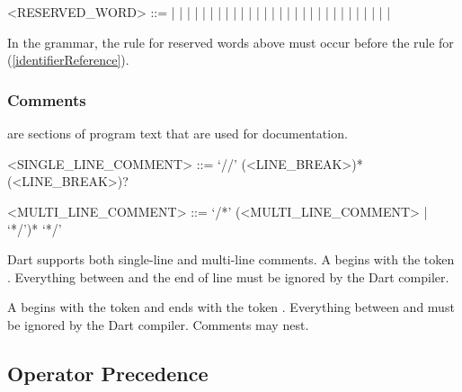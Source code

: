 \documentclass[makeidx]{article}
\begin{document}
{\begin{grammar}
<RESERVED\_WORD> ::= \ASSERT{} | \BREAK{} | \CASE{} | \CATCH{} |
    \CLASS{} | \CONST{}
  \alt\hspace{-3mm} \CONTINUE{} | \DEFAULT{} | \DO{} | \ELSE{} | \ENUM{} |
    \EXTENDS{} | \FALSE{} | \FINAL{} | \FINALLY{} | \FOR{}
  \alt\hspace{-3mm} \IF{} | \IN{} | \IS{} | \NEW{} | \NULL{} | \RETHROW{} |
    \RETURN{} | \SUPER{} | \SWITCH{} | \THIS{} | \THROW{}
  \alt\hspace{-3mm} \TRUE{} | \TRY{} | \VAR{} | \VOID{} | \WHILE{} | \WITH{}
\end{grammar}

\LMHash{}%
In the grammar, the rule for reserved words above must occur
before the rule for 
(\ref{identifierReference}).



\subsubsection{Comments}

\LMHash{}%
are sections of program text that are used for documentation.

\begin{grammar}
<SINGLE\_LINE\_COMMENT> ::= \gnewline{}
  `//' \gtilde(<LINE\_BREAK>)* (<LINE\_BREAK>)?

<MULTI\_LINE\_COMMENT> ::= \gnewline{}
  `/*' (<MULTI\_LINE\_COMMENT> | \gtilde{} `*/')* `*/'
\end{grammar}

\LMHash{}%
Dart supports both single-line and multi-line comments.
A  begins with the token \code{//}.
Everything between \code{//} and the end of line
must be ignored by the Dart compiler.

\LMHash{}%
A  begins with the token \code{/*}
and ends with the token \code{*/}.
Everything between \code{/*} and \code{*/}
must be ignored by the Dart compiler.
Comments may nest.


\subsection{Operator Precedence}

}
\end{document}
